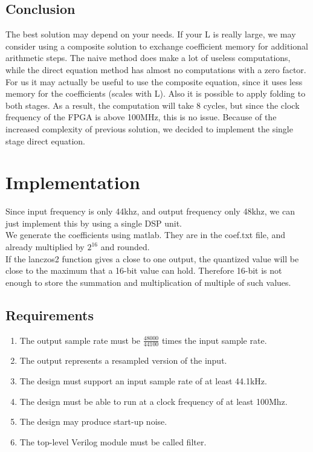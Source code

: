 \documentclass[a4paper,twoside,11pt, fleqn]{article}
\begin{document}
\subsection{Conclusion}
The best solution may depend on your needs. If your L is really large, we may consider using a composite solution to exchange coefficient memory for additional arithmetic steps. The naive method does make a lot of useless computations, while the direct equation method has almost no computations with a zero factor.\\ 

For us it may actually be useful to use the composite equation, since it uses less memory for the coefficients (scales with L). Also it is possible to apply folding to both stages. As a result, the computation will take 8 cycles, but since the clock frequency of the FPGA is above 100MHz, this is no issue. Because of the increased complexity of previous solution, we decided to implement the single stage direct equation.\\

\newpage
\section{Implementation}
Since input frequency is only 44khz, and output frequency only 48khz, we can just implement this by using a single DSP unit.\\

We generate the coefficients using matlab. They are in the coef.txt file, and already multiplied by $2^{16}$ and rounded.\\

If the lanczos2 function gives a close to one output, the quantized value will be close to the maximum that a 16-bit value can hold. Therefore 16-bit is not enough to store the summation and multiplication of multiple of such values.\\

\subsection{Requirements}
\label{sec:req}

\begin{enumerate}
	\item The output sample rate must be $\frac{48000}{44100}$ times the input sample rate.
	\item The output represents a resampled version of the input.
	\item The design must support an input sample rate of at least 44.1kHz.
	\item The design must be able to run at a clock frequency of at least 100Mhz.
	\item The design may produce start-up noise.
	\item The top-level Verilog module must be called filter.
\end{enumerate}
\end{document}
